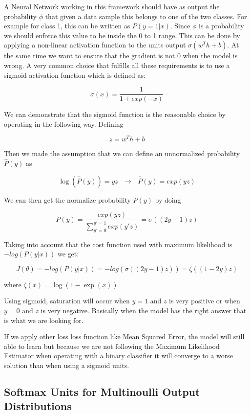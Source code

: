 \noindent A Neural Network working in this framework should have as output the probability $\phi$ that given a data sample this belongs to one of the two classes. For example for class 1, this can be written as $P(y=1 | x) $. Since $\phi$ is a probability we should enforce this value to be inside the 0 to 1 range. This can be done by applying a non-linear activation function to the units output $\sigma \left(  w^Th + b \right)$. At the same time we want to ensure that the gradient is not 0 when the model is wrong. A very common choice that fulfills all these requirements is to use a sigmoid activation function which is defined as:

$$ \sigma (x) = \frac{1}{1 + exp(-x)} $$

\noindent We can demonstrate that the sigmoid function is the reasonable choice by operating in the following way. Defining

$$ z = w^T h + b$$

\noindent Then we made the assumption that we can define an unnormalized probability $\hat{P}(y)$ as

$$ \log \left( \hat{P}(y) \right) = yz ~~~ \rightarrow ~~~ \hat{P}(y) = exp(yz) $$

\noindent We can then get the normalize probability $P(y)$ by doing

$$ P(y) = \frac{exp(yz)}{\sum_{y'=0}^{y'=1} exp(y'z)} = \sigma \left( (2y -1)z \right)$$

\noindent Taking into account that the cost function used with maximum likelihood is $-log \left(P(y|x) \right)$ we get:

$$ J(\theta) = - log \left( P(y | x) \right) = - log \left( \sigma \left( (2y -1) z \right) \right) = \zeta \left( \left( 1 -2y \right) z \right)$$

where $\zeta (x) = \log \left( 1 - \exp{(x)} \right)$

\noindent Using sigmoid, saturation will occur when $y=1$ and $z$ is very positive or when $y=0$ and $z$ is very negative. Basically when the model has the right answer that is what we are looking for.

\noindent If we apply other loss loss function like Mean Squared Error, the model will still able to learn but because we are not following the Maximum Likelihood Estimator when operating with a binary classifier it will converge to a worse solution than when using a sigmoid units.

\subsection{Softmax Units for Multinoulli Output Distributions}

